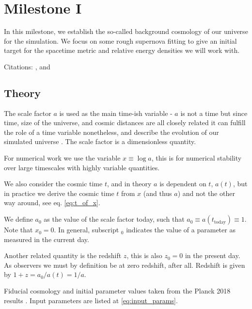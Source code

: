 \section{Milestone I}\label{sec:milestone_1}
In this milestone, we establish the so-called background cosmology of our universe for the simulation. We focus on some rough supernova fitting to give an initial target for the spacetime metric and relative energy densities we will work with.

Citations: \citet{baumannLectureNotesCosmology2017}, \citet{dodelsonModernCosmology2003} and \citep{callinHowCalculateCMB2006, wintherCosmologyIILecture2024, huCompleteTreatmentCMB1998}

\subsection{Theory}
The scale factor $a$ is used as the main time-ish variable - $a$ is not a time but since time, size of the universe, and cosmic distances are all closely related it can fulfill the role of a time variable nonetheless, and describe the evolution of our simulated universe \citep{wintherCosmologyIILecture2024}. The scale factor is a dimensionless quantity.

For numerical work we use the variable $x \equiv \log a$, this is for numerical stability over large timescales with highly variable quantities. 

We also consider the cosmic time $t$, and in theory $a$ is dependent on $t$, $a(t)$, but in practice we derive the cosmic time $t$ from $x$ (and thus $a$) and not the other way around, see eq. \ref{eq:t_of_x}.

We define $a_0$ as the value of the scale factor today, such that $a_0 \equiv a(t_{\text{today}}) \equiv 1$. Note that $x_0 = 0$. In general, subscript $_0$ indicates the value of a parameter as measured in the current day.

Another related quantity is the redshift $z$, this is also $z_0 = 0$ in the present day. As observers we must by definition be at zero redshift, after all. Redshift is given by $1+z = a_0 / a(t) = 1/a$.

\newpage
Fiducial cosmology and initial parameter values taken from the Planck 2018 results \citep{collaborationPlanck2018Results2020}. Input parameters are listed at \ref{eq:input_params}.

